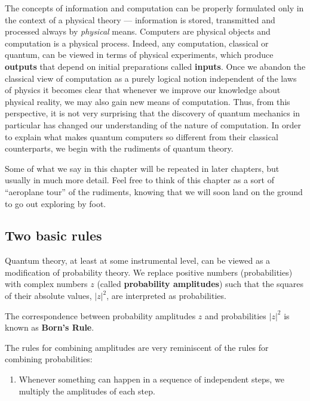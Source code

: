 \documentclass[fleqn]{article}
\providecommand{\tightlist}{%
  \setlength{\itemsep}{0pt}\setlength{\parskip}{0pt}}
\newenvironment{idea}{\noindent}{\medskip}
\begin{document}
The concepts of information and computation can be properly formulated only in the context of a physical theory --- information is stored, transmitted and processed always by \emph{physical} means.
Computers are physical objects and computation is a physical process.
Indeed, any computation, classical or quantum, can be viewed in terms of physical experiments, which produce \textbf{outputs} that depend on initial preparations called \textbf{inputs}.
Once we abandon the classical view of computation as a purely logical notion independent of the laws of physics it becomes clear that whenever we improve our knowledge about physical reality, we may also gain new means of computation.
Thus, from this perspective, it is not very surprising that the discovery of quantum mechanics in particular has changed our understanding of the nature of computation.
In order to explain what makes quantum computers so different from their classical counterparts, we begin with the rudiments of quantum theory.

Some of what we say in this chapter will be repeated in later chapters, but usually in much more detail.
Feel free to think of this chapter as a sort of ``aeroplane tour'' of the rudiments, knowing that we will soon land on the ground to go out exploring by foot.

\hypertarget{two-basic-rules}{%
\subsection{Two basic rules}\label{two-basic-rules}}

Quantum theory, at least at some instrumental level, can be viewed as a modification of probability theory.
We replace positive numbers (probabilities) with complex numbers \(z\) (called \textbf{probability amplitudes}) such that the squares of their absolute values, \(|z|^2\), are interpreted as probabilities.

\begin{idea}

The correspondence between probability amplitudes \(z\) and probabilities \(|z|^2\) is known as \textbf{Born's Rule}.

\end{idea}

The rules for combining amplitudes are very reminiscent of the rules for combining probabilities:

\begin{enumerate}
\def\labelenumi{\arabic{enumi}.}
\tightlist
\item
  Whenever something can happen in a sequence of independent steps, we multiply the amplitudes of each step.
\end{enumerate}
\end{document}
